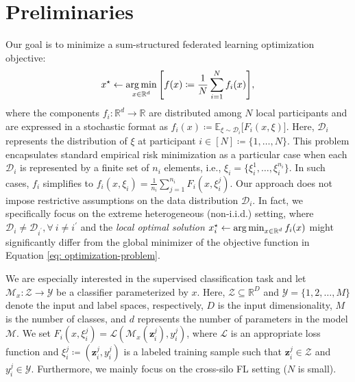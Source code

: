 \documentclass{article}
\begin{document}
\section{Preliminaries}
Our goal is to minimize a sum-structured federated learning optimization objective: 
\begin{equation}
    \begin{split}
        x^{\star} \leftarrow  \operatorname*{arg\,min}_{x \in \mathbb{R}^d} \Bigg[ f(x) \coloneqq \frac{1}{N} \sum_{i=1}^N f_i(x) \Bigg], 
        \label{eq: optimization-problem}
    \end{split}
\end{equation}
where the components $f_i: \mathbb{R}^d \rightarrow \mathbb{R}$ are distributed among $N$ local participants and are expressed in a stochastic format as $f_i(x) \coloneqq \mathbb{E}_{\xi \sim \mathcal{D}_i}\big[F_i(x, \xi)\big]$. Here, $\mathcal{D}_i$ represents the distribution of $\xi$ at participant $i \in [N] \coloneqq \{1,\ldots,N\}$. This problem encapsulates standard empirical risk minimization as a particular case when each $\mathcal{D}_i$ is represented by a finite set of $n_i$ elements, i.e., $\xi_i = \{\xi_i^1, \ldots, \xi_i^{n_i} \}$. In such cases, $f_i$ simplifies to $f_i(x,\xi_i) = \frac{1}{n_i} \sum_{j=1}^{n_i} F_i(x,\xi_i^j)$. Our approach does not impose restrictive assumptions on the data distribution $\mathcal{D}_i$. In fact, we specifically focus on the extreme heterogeneous (non-i.i.d.) setting, where $\mathcal{D}_i \neq \mathcal{D}_{i^{'}}, \forall ~ i \neq i^{'}$ and the \textit{local optimal solution} $x_i^{\star}\leftarrow \operatorname*{arg\,min}_{x \in \mathbb{R}^d} f_i(x)$ might significantly differ from the global minimizer of the objective function in Equation \ref{eq: optimization-problem}. 

We are especially interested in the supervised classification task and let $\mathcal{M}_x: \mathcal{Z} \rightarrow \mathcal{Y}$ be a classifier parameterized by $x$. Here, $\mathcal{Z} \subseteq \mathbb{R}^D$ and $\mathcal{Y} = \{1, 2, \ldots, M\}$ denote the input and label spaces, respectively, $D$ is the input dimensionality, $M$ is the number of classes, and $d$ represents the number of parameters in the model $\mathcal{M}$. We set $F_i(x,\xi_i^j) = \mathcal{L}(\mathcal{M}_x(\mathbf{z}_i^j), y_i^j)$, where $\mathcal{L}$ is an appropriate loss function and $\xi_i^j \coloneq (\mathbf{z}_i^j, y_i^j)$ is a labeled training sample such that $\mathbf{z}_i^j \in \mathcal{Z}$ and $y_i^j \in \mathcal{Y}$. Furthermore, we mainly focus on the cross-silo FL setting ($N$ is small). 
\end{document}
